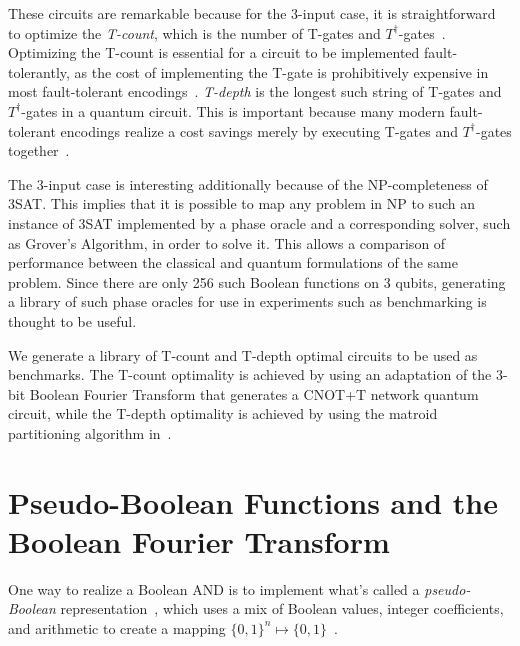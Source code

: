 \documentclass[a4paper]{article}
\begin{document}
These circuits are remarkable because for the 3-input case, it is straightforward to optimize
the {\it T-count}, which is the number of T-gates and $T^{\dagger}$-gates~\cite{amy-meet-in-middle}.
Optimizing the T-count is essential for a circuit to be implemented fault-tolerantly, as
the cost of implementing the T-gate is prohibitively expensive in most fault-tolerant
encodings~\cite{bib-herr-lattice,bib-fowler-bridge}. {\it T-depth} is the longest such
string of T-gates and $T^{\dagger}$-gates in a quantum circuit. This is important because many modern
fault-tolerant encodings realize a cost savings merely by executing T-gates and $T^{\dagger}$-gates
together~\cite{bib-google-ecc}.

The 3-input case is interesting additionally because of the NP-completeness of 3SAT. This implies
that it is possible to map any problem in NP to such an instance of 3SAT implemented by a phase oracle
and a corresponding solver, such as Grover's Algorithm, in order to solve it. This allows a comparison
of performance between the classical and quantum formulations of the same problem. Since there are
only 256 such Boolean functions on 3 qubits, generating a library of such phase oracles for use in
experiments such as benchmarking is thought to be useful.

We generate a library of T-count and T-depth optimal circuits to be used as benchmarks. The T-count
optimality is achieved by using an adaptation of the 3-bit Boolean Fourier Transform that generates
a CNOT+T network quantum circuit, while the T-depth optimality is achieved by using the matroid partitioning
algorithm in~\cite{bib-amy-matroid}.

\section{Pseudo-Boolean Functions and the Boolean Fourier Transform}

One way to realize a Boolean AND is to implement what's called a {\it pseudo-Boolean}
representation~\cite{bib-barenco-elementary,bib-amy-cnot}, which uses a mix of
Boolean values, integer coefficients, and arithmetic to create a mapping $\{0,1\}^n \mapsto \{0,1\}$~\cite{bib-amy-rm}.
\end{document}
